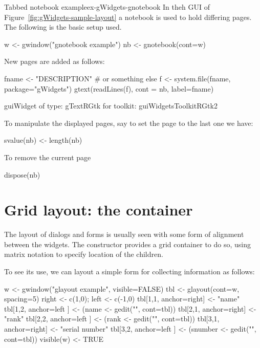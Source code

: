\begin{example}{Tabbed notebook example}{ex-gWidgets-gnotebook}
 In theh GUI of Figure~\ref{fig:gWidgets-sample-layout} a notebook is
 used to hold differing pages. The following is the basic setup used.
\begin{Schunk}
\begin{Sinput}
 w <- gwindow("gnotebook example")
 nb <- gnotebook(cont=w)
\end{Sinput}
\end{Schunk}

New pages are added as follows:
\begin{Schunk}
\begin{Sinput}
 fname <- "DESCRIPTION"                  # or something else
 f <- system.file(fname, package="gWidgets")
 gtext(readLines(f), cont = nb, label=fname)
\end{Sinput}
\begin{Soutput}
guiWidget of type: gTextRGtk for toolkit: guiWidgetsToolkitRGtk2 
\end{Soutput}
\end{Schunk}

To manipulate the displayed pages, say to set the page to the last one
we have:
\begin{Schunk}
\begin{Sinput}
 svalue(nb) <- length(nb)
\end{Sinput}
\end{Schunk}
To remove the current  page
\begin{Schunk}
\begin{Sinput}
 dispose(nb)
\end{Sinput}
\end{Schunk}
%
\end{example}

\section{Grid layout: the  container}
\label{sec:gWidgets-glayout-container}

The layout of dialogs and forms is usually seen with some form of
alignment between the widgets. The  constructor
provides a grid container to do so, using matrix notation to specify
location of the children.  

To see its use, we can layout a simple form for collecting information
as follows:

\begin{Schunk}
\begin{Sinput}
 w <- gwindow("glayout example", visible=FALSE)
 tbl <- glayout(cont=w, spacing=5)
 right <- c(1,0); left <- c(-1,0)
 tbl[1,1, anchor=right] <- "name"
 tbl[1,2, anchor=left ] <- (name <- gedit("", cont=tbl))
 tbl[2,1, anchor=right] <- "rank"
 tbl[2,2, anchor=left ] <- (rank <- gedit("", cont=tbl))
 tbl[3,1, anchor=right] <- "serial number"
 tbl[3,2, anchor=left ] <- (snumber <- gedit("", cont=tbl))
 visible(w) <- TRUE
\end{Sinput}
\end{Schunk}


